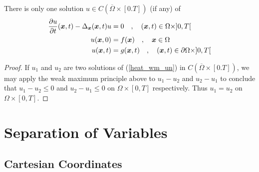 \begin{cor}
There is only one solution
$u \in C(\overline{\Omega}\times [0.T])$ (if any) of
\begin{equation} \label{heat_wm_un}
\begin{split}
\frac{\partial{u}}{\partial t}({\bm{x}},t) - \Delta_{{\bm{x}}}({\bm{x}},t) u
&=0 \quad , \quad ({\bm{x}},t) \in \Omega \times ]0,T[ \\
u({\bm{x}},0) &= f({\bm{x}}) \quad , \quad {\bm{x}} \in \Omega \\
u({\bm{x}},t) &= g({\bm{x}},t) \quad , \quad ({\bm{x}},t) \in
\partial \Omega \times ]0,T[
\end{split}
\end{equation}
\end{cor}

\begin{proof}
If $u_1$ and $u_2$ are two solutions of (\ref{heat_wm_un}) in
$C(\overline{\Omega}\times [0.T])$, we may apply the weak maximum principle
above to $u_1-u_2$ and $u_2-u_1$ to conclude that
$u_1 - u_2 \leq 0$ and $u_2 - u_1 \leq 0$ on $\Omega \times [0,T]$
respectively.  Thus $u_1 =u_2$ on $\Omega \times [0,T]$.
\end{proof}

\section{Separation of Variables}

\subsection{Cartesian Coordinates}

